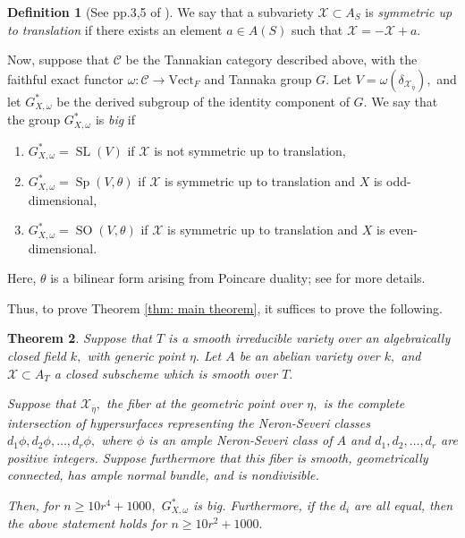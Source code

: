 \documentclass{article}
\newtheorem{thm}{Theorem}[section]
\theoremstyle{definition}
\newtheorem{defn}[thm]{Definition}
\theoremstyle{remark}
\DeclareMathOperator{\sll}{SL}
\DeclareMathOperator{\spp}{Sp}
\DeclareMathOperator{\so}{SO}
\begin{document}
\begin{defn}[See pp.3,5 of \cite{jklm23}]
\par We say that a subvariety $\mathcal{X} \subset A_S$ is \textit{symmetric up to translation} if there exists an element $a \in A(S)$ such that $\mathcal{X} = -\mathcal{X} + a.$
\par Now, suppose that $\mathcal{C}$ be the Tannakian category described above, with the faithful exact functor $\omega: \mathcal{C} \rightarrow \text{Vect}_F$ and Tannaka group $G.$ Let $V = \omega(\delta_{\mathcal{X}_{\overline{\eta}}}),$ and let $G^*_{X, \omega}$ be the derived subgroup of the identity component of $G.$ We say that the group $G^*_{X, \omega}$ is \textit{big} if
\begin{enumerate}
    \item $G^*_{X, \omega} = \sll(V)$ if $\mathcal{X}$ is not symmetric up to translation,
    \item $G^*_{X, \omega} = \spp(V, \theta)$ if $\mathcal{X}$ is symmetric up to translation and $X$ is odd-dimensional, 
    \item $G^*_{X, \omega} = \so(V, \theta)$ if $\mathcal{X}$ is symmetric up to translation and $X$ is even-dimensional.
\end{enumerate}
Here, $\theta$ is a bilinear form arising from Poincare duality; see \cite[p.2]{jklm23} for more details.
\end{defn}
\par Thus, to prove Theorem \ref{thm: main theorem}, it suffices to prove the following.
\begin{thm}\label{thm: big monodromy main theorem}
Suppose that $T$ is a smooth irreducible variety over an algebraically closed field $k,$ with generic point $\eta.$ Let $A$ be an abelian variety over $k,$ and $\mathcal{X} \subset A_T$ a closed subscheme which is smooth over $T.$ 
\par Suppose that $\mathcal{X}_{\overline{\eta}},$ the fiber at the geometric point over $\eta,$ is the complete intersection of hypersurfaces representing the Neron-Severi classes $d_1\phi, d_2\phi, \ldots, d_r\phi,$ where $\phi$ is an ample Neron-Severi class of $A$ and $d_1, d_2, \ldots, d_r$ are positive integers. Suppose furthermore that this fiber is smooth, geometrically connected, has ample normal bundle, and is nondivisible. 
\par Then, for $n \geq 10r^4 + 1000,$ $G^*_{X, \omega}$ is big. Furthermore, if the $d_i$ are all equal, then the above statement holds for $n \geq 10r^2 + 1000.$
\end{thm} 
\end{document}
